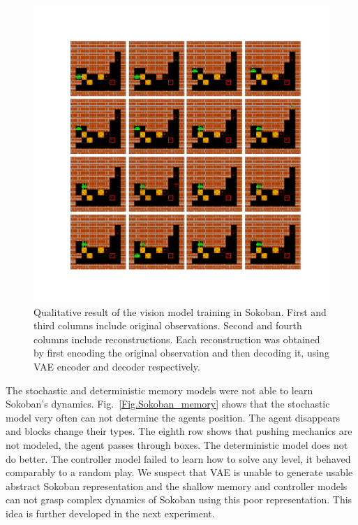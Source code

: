 \begin{figure}[H]
\includegraphics[width=1\textwidth,keepaspectratio]{figures/Sokoban_vision.png}
\caption[Qualitative result of the vision model training in Sokoban]{Qualitative result of the vision model training in Sokoban. First and third columns include original observations. Second and fourth columns include reconstructions. Each reconstruction was obtained by first encoding the original observation and then decoding it, using VAE encoder and decoder respectively.}
\label{Fig.Sokoban_vision}
\end{figure}

The stochastic and deterministic memory models were not able to learn Sokoban’s dynamics. Fig.~\ref{Fig.Sokoban_memory} shows that the stochastic model very often can not determine the agents position. The agent disappears and blocks change their types. The eighth row shows that pushing mechanics are not modeled, the agent passes through boxes. The deterministic model does not do better.
The controller model failed to learn how to solve any level, it behaved comparably to a random play. We suspect that VAE is unable to generate usable abstract Sokoban representation and the shallow memory and controller models can not grasp complex dynamics of Sokoban using this poor representation. This idea is further developed in the next experiment.

